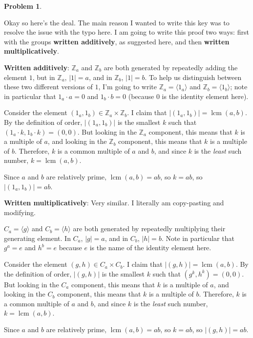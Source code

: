 \documentclass[12pt]{article}
\theoremstyle{definition} %
\newtheorem{problem}{Problem}
\newcommand{\Balert}[1]{\textcolor{xBlue}{#1}}
\newcommand{\Z}{\mathbb{Z}}
\def\<{\langle}
\def\>{\rangle}
\DeclareMathOperator{\lcm}{lcm}
\newenvironment{red}{\color{red}}{\ignorespacesafterend}
\newenvironment{xBlue}{\color{xBlue}}{\ignorespacesafterend}
\begin{document}
\begin{problem}
\begin{enumerate}[(a)]
        \begin{red}
            Okay so here's the deal. The main reason I wanted to write this key was to resolve the issue with the typo here. I am going to write this proof two ways: first with the groups \textbf{written additively}, as suggested here, and then \Balert{\textbf{written multiplicatively}.}

            \textbf{Written additively}: $\Z_a$ and $\Z_b$ are both generated by repeatedly adding the element $1$, but in $\Z_a$, $|1| = a$, and in $\Z_b$, $|1| = b$. To help us distinguish between these two different versions of $1$, I'm going to write $\Z_a = \<1_a\>$ and $\Z_b = \<1_b\>$; note in particular that $1_a \cdot a = 0$ and $1_b \cdot b = 0$ (because 0 is the identity element here).

            Consider the element $(1_a, 1_b) \in \Z_a \times \Z_b$. I claim that $|(1_a, 1_b)| = \lcm(a, b)$. By the definition of order, $|(1_a, 1_b)|$ is the smallest $k$ such that $(1_a\cdot k, 1_b \cdot k) = (0, 0)$. But looking in the $\Z_a$ component, this means that $k$ is a multiple of $a$, and looking in the $\Z_b$ component, this means that $k$ is a multiple of $b$. Therefore, $k$ is a common multiple of $a$ and $b$, and since $k$ is the \textit{least} such number, $k = \lcm(a, b)$.

            Since $a$ and $b$ are relatively prime, $\lcm(a, b) = ab$, so $k = ab$, so $|(1_a, 1_b)| = ab$.
        \end{red}

        \begin{xBlue}
            \textbf{Written multiplicatively}: Very similar. I literally am copy-pasting and modifying.

            $C_a = \<g\>$ and $C_b = \<h\>$ are both generated by repeatedly multiplying their generating element. In $C_a$, $|g| = a$, and in $C_b$, $|h| = b$. Note in particular that $g^a = e$ and $h^b = e$ because $e$ is the name of the identity element here.

            Consider the element $(g, h) \in C_a \times C_b$. I claim that $|(g, h)| = \lcm(a, b)$. By the definition of order, $|(g,h)|$ is the smallest $k$ such that $(g^k, h^k) = (0, 0)$. But looking in the $C_a$ component, this means that $k$ is a multiple of $a$, and looking in the $C_b$ component, this means that $k$ is a multiple of $b$. Therefore, $k$ is a common multiple of $a$ and $b$, and since $k$ is the \textit{least} such number, $k = \lcm(a, b)$.

            Since $a$ and $b$ are relatively prime, $\lcm(a, b) = ab$, so $k = ab$, so $|(g, h)| = ab$.
        \end{xBlue}


\end{enumerate}
\end{problem}
\end{document}
